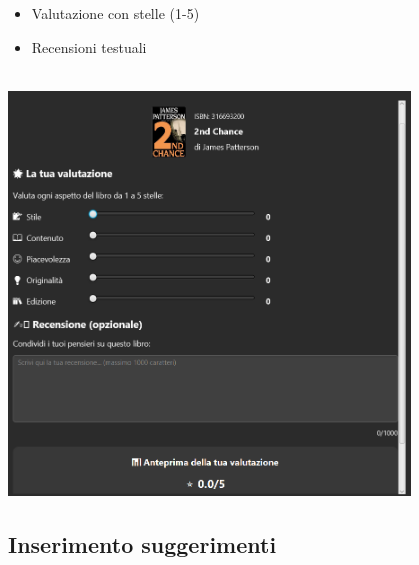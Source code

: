 \documentclass[12pt,a4paper]{article}
\begin{document}
\begin{itemize}
    \item Valutazione con stelle (1-5)
    \item Recensioni testuali
\end{itemize}
\\\includegraphics[width=0.8\textwidth]{img/valutazione}

\subsection{Inserimento suggerimenti}
\end{document}
